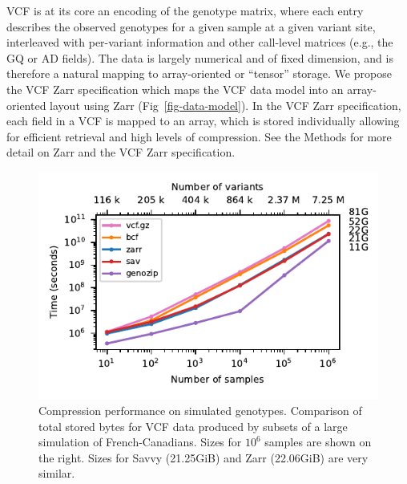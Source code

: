 \documentclass[a4paper,num-refs]{oup-contemporary}
\begin{document}
VCF is at its core an encoding of the genotype matrix, where each entry
describes the observed genotypes for a given sample at a given variant site,
interleaved with per-variant information
and other call-level matrices (e.g., the GQ or AD fields).
The data is largely numerical and of fixed dimension, 
and is therefore a natural mapping to array-oriented 
or ``tensor'' storage.
We propose the VCF Zarr specification which maps the 
VCF data model into an array-oriented layout using Zarr 
(Fig~\ref{fig-data-model}). 
In the VCF Zarr specification, 
each field in a VCF is mapped to an array, 
which is stored individually allowing for efficient retrieval and 
high levels of compression.
See the Methods for more detail on Zarr and the VCF Zarr
specification.

\begin{figure}
\begin{center}
\includegraphics[]{figures/data-scaling}
\end{center}
\caption{Compression performance on simulated genotypes.
Comparison of total stored bytes for VCF data produced 
by subsets of a large simulation of French-Canadians.
Sizes for $10^6$ samples are shown on the right. Sizes 
for Savvy (21.25GiB) and Zarr (22.06GiB) are very similar.
\label{fig-data-storage}}
\end{figure}
\end{document}
